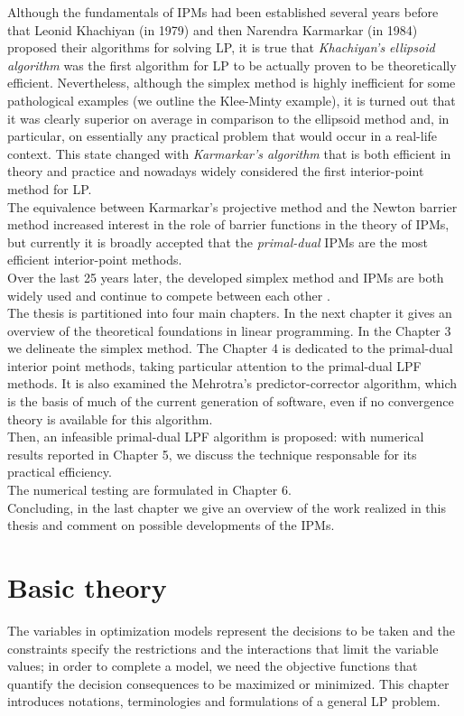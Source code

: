 \documentclass[a4paper,10 pt,titlepage,twoside]{book}
\theoremstyle{plain}
\theoremstyle{definition}
\theoremstyle{remark}
\begin{document}
Although the fundamentals of IPMs had been established several years before that Leonid Khachiyan (in 1979) and then Narendra Karmarkar (in 1984) proposed their algorithms for solving LP, it is true that \textit{Khachiyan’s ellipsoid algorithm} was the first algorithm for LP to be actually proven to be theoretically efficient. Nevertheless, although the simplex method is highly inefficient for some pathological examples (we outline the Klee-Minty example), it is turned out that it was clearly superior on average in comparison to the ellipsoid method and, in particular, on essentially any practical problem that would occur in a real-life context. This state changed with \textit{Karmarkar’s algorithm} that is both efficient in theory and practice and nowadays widely considered the first interior-point method for LP.\\
The equivalence between Karmarkar's projective method and the Newton barrier method increased interest in the role of barrier functions in the theory of IPMs, but currently it is broadly accepted that the \textit{primal-dual} IPMs are the most efficient interior-point methods.\\
Over the last 25 years later, the developed simplex method and IPMs are both widely used and continue to compete between each other \cite{25y}. \\
The thesis is partitioned into four main chapters.
In the next chapter it gives an overview of the theoretical foundations in linear programming. In the Chapter 3 we delineate the simplex method. The Chapter 4 is dedicated to the primal-dual interior point methods, taking particular attention to the primal-dual LPF methods. It is also examined the Mehrotra's predictor-corrector algorithm, which is the basis of much of the current generation of software, even if no convergence theory is available for this algorithm.\\
Then, an infeasible primal-dual LPF algorithm is proposed: with numerical results reported in Chapter 5, we discuss the technique responsable for its practical efficiency.\\
The numerical testing are formulated in Chapter 6.\\
Concluding, in the last chapter we give an overview of the work realized in this thesis and comment on possible developments of the IPMs. 

%
%

\chapter{Basic theory}
The variables in optimization models represent the decisions to be taken and the constraints specify the restrictions and the interactions that limit the variable values; in order to complete a model, we need the objective functions that quantify the decision consequences to be maximized or minimized. This chapter introduces notations, terminologies and formulations of a general LP problem.
\end{document}
